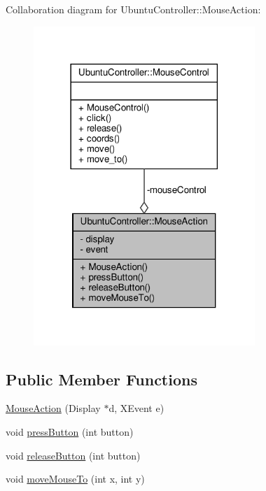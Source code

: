 Collaboration diagram for Ubuntu\+Controller\+:\+:Mouse\+Action\+:
\nopagebreak
\begin{figure}[H]
\begin{center}
\leavevmode
\includegraphics[width=237pt]{class_ubuntu_controller_1_1_mouse_action__coll__graph}
\end{center}
\end{figure}
\subsection*{Public Member Functions}
\begin{DoxyCompactItemize}
\item 
\hyperlink{class_ubuntu_controller_1_1_mouse_action_a42e540b994144f3f8775baded5370b14}{Mouse\+Action} (Display $\ast$d, X\+Event e)
\item 
void \hyperlink{class_ubuntu_controller_1_1_mouse_action_aa017b86a7e358e7a74a8ec50a5a191cf}{press\+Button} (int button)
\item 
void \hyperlink{class_ubuntu_controller_1_1_mouse_action_ab1ac193e88baf8614c55ca2fa7a3b430}{release\+Button} (int button)
\item 
void \hyperlink{class_ubuntu_controller_1_1_mouse_action_a7a14cab01ad2ccdb1b135d4bae939fe2}{move\+Mouse\+To} (int x, int y)
\end{DoxyCompactItemize}
